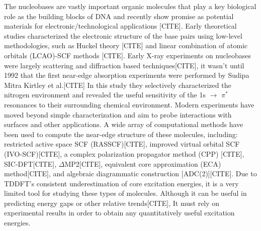 \documentclass[12pt]{article}
\begin{document}
  The nucleobases are vastly important organic molecules that play a key biological role as the building blocks of DNA and recently show promise as potential materials for electronic/technological applications [CITE]. Early theoretical studies characterized the electronic structure of the base pairs using low-level methodologies, such as Huckel theory [CITE] and linear combination of atomic orbitals (LCAO)-SCF methods [CITE]. Early X-ray experiments on nucleobases were largely scattering and diffraction based techniques[CITE], it wasn't until 1992 that the first near-edge absorption experiments were performed by Sudipa Mitra Kirtley et al.[CITE] In this study they selectively characterized the nitrogen environment and revealed the useful sensitivity of the 1s $\rightarrow$ $\pi^*$ resonances to their surrounding chemical environment. Modern experiments have moved beyond simple characterization and aim to probe interactions with surfaces and other applications.  A wide array of computational methods have been used to compute the near-edge structure of these molecules, including: restricted active space SCF (RASSCF)[CITE], improved virtual orbital SCF (IVO-SCF)[CITE], a complex polarization propagator method (CPP) [CITE], SIC-DFT[CITE], $\Delta$MP2[CITE], equivalent core approximation (ECA) method[CITE], and algebraic diagrammatic construction [ADC(2)][CITE]. Due to TDDFT's consistent underestimation of core excitation energies, it is a very limited tool for studying these types of molecules. Although it can be useful in predicting energy gaps or other relative trends[CITE], It must rely on experimental results in order to obtain any quantitatively useful excitation energies.

\end{document}

